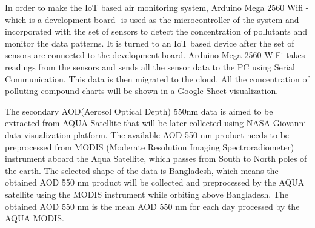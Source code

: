 In order to make the IoT based air monitoring system, Arduino Mega 2560 Wifi - which is a development board- is used as the microcontroller of the system and incorporated with the set of sensors to detect the concentration of pollutants and monitor the data patterns. It is turned to an IoT based device after the set of sensors are connected to the development board. Arduino Mega 2560 WiFi takes readings from the sensors and sends all the sensor data to the PC using Serial Communication. This data is then migrated to the cloud. All the concentration of polluting compound charts will be shown in a Google Sheet visualization.

The secondary AOD(Aerosol Optical Depth)  550nm data is aimed to be extracted from AQUA Satellite that will be later collected using NASA Giovanni data visualization platform. The available AOD 550 nm product needs to be preprocessed from MODIS (Moderate Resolution Imaging Spectroradiometer) instrument aboard the Aqua Satellite, which passes from South to North poles of the earth. The selected shape of the data is Bangladesh, which means the obtained AOD 550 nm product will be collected and preprocessed by the AQUA satellite using the MODIS instrument while orbiting above Bangladesh. The obtained AOD 550 nm is the mean AOD 550 nm for each day processed by the AQUA MODIS.




